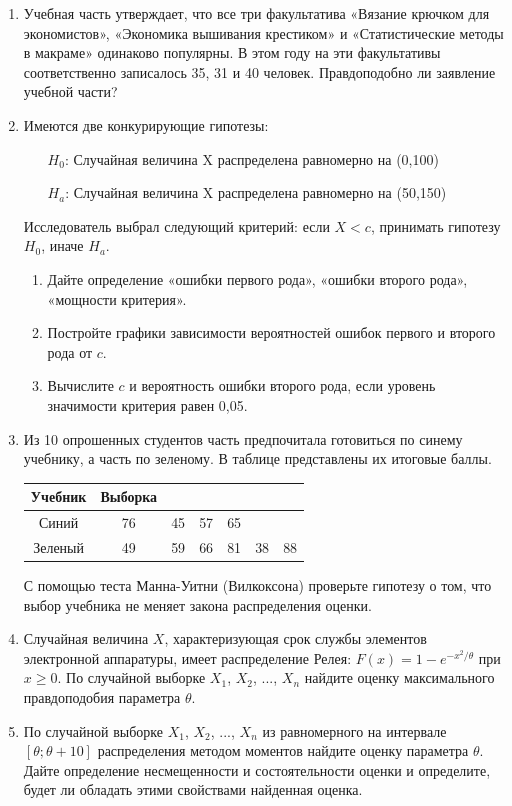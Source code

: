 \documentclass[12pt, a4paper]{article}\usepackage[]{graphicx}\usepackage[]{color}
\begin{document}
\begin{enumerate}
\begin{enumerate}
\end{enumerate}
\item Учебная часть утверждает, что все три факультатива «Вязание крючком для экономистов», «Экономика вышивания крестиком» и «Статистические методы в макраме» одинаково популярны. В этом году на эти факультативы соответственно записалось 35, 31 и 40 человек. Правдоподобно ли заявление учебной части?
\item Имеются две конкурирующие гипотезы:
\begin{enumerate}
\item[$H_0$:] Случайная величина X распределена равномерно на (0,100)
\item[$H_a$:] Случайная величина X распределена равномерно на (50,150)
\end{enumerate}
Исследователь выбрал следующий критерий: если $X<c$, принимать гипотезу $H_0$, иначе  $H_a$.
\begin{enumerate}
\item Дайте определение «ошибки первого рода», «ошибки второго рода», «мощности критерия».
\item Постройте графики зависимости вероятностей ошибок первого и второго рода от $c$.
\item Вычислите $c$ и вероятность ошибки второго рода, если уровень значимости критерия равен 0,05.
\end{enumerate}
\item Из 10 опрошенных студентов часть предпочитала готовиться по синему учебнику, а часть по зеленому. В таблице представлены их итоговые баллы.


\begin{tabular}{c|cccccc}
Учебник & Выборка &  &  &   &   &   \\
\hline
Синий & 76 & 45 & 57 & 65 &   &   \\
Зеленый & 49 & 59 & 66 & 81 & 38 & 88 \\
\end{tabular}


С помощью теста Манна-Уитни (Вилкоксона) проверьте гипотезу о том, что выбор учебника не меняет закона распределения оценки.

\item Случайная величина $X$, характеризующая срок службы элементов электронной аппаратуры, имеет распределение Релея: $F(x)=1-e^{-x^2/\theta}$ при $x\geq 0$. По случайной выборке $X_1$, $X_2$, ..., $X_n$ найдите оценку максимального правдоподобия параметра $\theta$.

\item По случайной выборке $X_1$, $X_2$, ..., $X_n$ из равномерного на интервале $[\theta;\theta+10]$ распределения методом моментов найдите оценку параметра $\theta$. Дайте определение несмещенности и состоятельности оценки и определите, будет ли обладать этими свойствами найденная оценка.


\end{enumerate}
\end{document}

